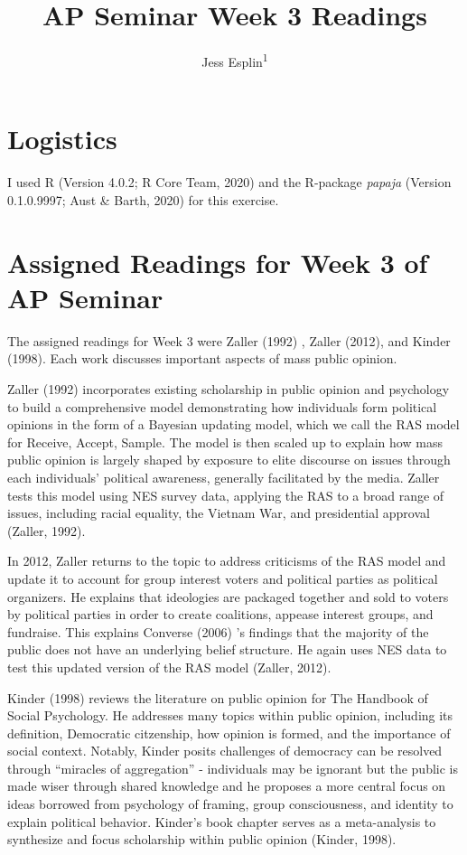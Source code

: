 \documentclass[
  english,
  man]{apa6}
\title{AP Seminar Week 3 Readings}
\author{Jess Esplin\textsuperscript{1}}
\date{}
\affiliation{\vspace{0.5cm}\textsuperscript{1} University of Wisconsin-Madison}
\begin{document}
\maketitle

\hypertarget{logistics}{%
\section{Logistics}\label{logistics}}

I used R (Version 4.0.2; R Core Team, 2020) and the R-package \emph{papaja} (Version 0.1.0.9997; Aust \& Barth, 2020) for this exercise.

\hypertarget{assigned-readings-for-week-3-of-ap-seminar}{%
\section{Assigned Readings for Week 3 of AP Seminar}\label{assigned-readings-for-week-3-of-ap-seminar}}

The assigned readings for Week 3 were Zaller (1992) , Zaller (2012), and Kinder (1998). Each work discusses important aspects of mass public opinion.

Zaller (1992) incorporates existing scholarship in public opinion and psychology to build a comprehensive model demonstrating how individuals form political opinions in the form of a Bayesian updating model, which we call the RAS model for Receive, Accept, Sample. The model is then scaled up to explain how mass public opinion is largely shaped by exposure to elite discourse on issues through each individuals' political awareness, generally facilitated by the media. Zaller tests this model using NES survey data, applying the RAS to a broad range of issues, including racial equality, the Vietnam War, and presidential approval (Zaller, 1992).

In 2012, Zaller returns to the topic to address criticisms of the RAS model and update it to account for group interest voters and political parties as political organizers. He explains that ideologies are packaged together and sold to voters by political parties in order to create coalitions, appease interest groups, and fundraise. This explains Converse (2006) 's findings that the majority of the public does not have an underlying belief structure. He again uses NES data to test this updated version of the RAS model (Zaller, 2012).

Kinder (1998) reviews the literature on public opinion for The Handbook of Social Psychology. He addresses many topics within public opinion, including its definition, Democratic citzenship, how opinion is formed, and the importance of social context. Notably, Kinder posits challenges of democracy can be resolved through \enquote{miracles of aggregation} - individuals may be ignorant but the public is made wiser through shared knowledge and he proposes a more central focus on ideas borrowed from psychology of framing, group consciousness, and identity to explain political behavior. Kinder's book chapter serves as a meta-analysis to synthesize and focus scholarship within public opinion (Kinder, 1998).
\end{document}
